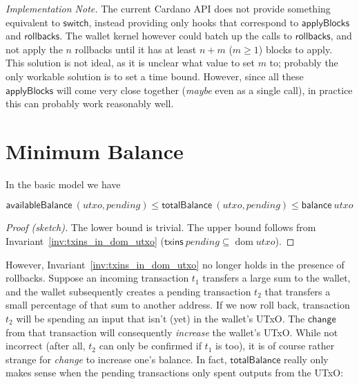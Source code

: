 \documentclass{article}
\DeclareMathOperator{\dom}{dom}
\theoremstyle{definition}{
  \newtheorem{lemma}{Lemma}[section] %
  \newtheorem{definition}[lemma]{Definition}
}
\theoremstyle{theorem}{
  \newtheorem{invariant}[lemma]{Invariant}
  \newtheorem{proofobligation}[lemma]{Proof Obligation}
}
\numberwithin{equation}{lemma}
\begin{document}
\emph{Implementation Note.} The current Cardano API does not provide something
equivalent to $\mathsf{switch}$, instead providing only hooks that correspond to
$\mathsf{applyBlocks}$ and $\mathsf{rollbacks}$. The wallet kernel however could
batch up the calls to $\mathsf{rollbacks}$, and not apply the $n$ rollbacks
until it has at least $n + m$ ($m \ge 1$) blocks to apply. This solution is not
ideal, as it is unclear what value to set $m$ to; probably the only workable
solution is to set a time bound. However, since all these $\mathsf{applyBlocks}$
will come very close together (\emph{maybe} even as a single call), in practice
this can probably work reasonably well.


\section{Minimum Balance}
\label{sec:tracking_expected_UTxO}

In the basic model we have
%
\begin{lemma}
\begin{equation*}
    \mathsf{availableBalance} ~ (\mathit{utxo}, \mathit{pending})
\le \mathsf{totalBalance}     ~ (\mathit{utxo}, \mathit{pending})
\le \mathsf{balance} ~ \mathit{utxo}
\end{equation*}
\label{lem:bounds_in_basic_model}
\end{lemma}

\begin{proof}[Proof (sketch)]
The lower bound is trivial. The upper bound follows from
Invariant~\ref{inv:txins_in_dom_utxo} ($\mathsf{txins} ~ \mathit{pending}
\subseteq \dom \mathit{utxo}$).
\end{proof}

However, Invariant~\ref{inv:txins_in_dom_utxo} no longer holds in the presence
of rollbacks. Suppose an incoming transaction $t_1$ transfers a large sum to the
wallet, and the wallet subsequently creates a pending transaction $t_2$ that
transfers a small percentage of that sum to another address. If we now roll
back, transaction $t_2$ will be spending an input that isn't (yet) in the
wallet's UTxO. The $\mathsf{change}$ from that transaction will consequently
\emph{increase} the wallet's UTxO. While not incorrect (after all, $t_2$ can
only be confirmed if $t_1$ is too), it is of course rather strange for
\emph{change} to increase one's balance. In fact, $\mathsf{totalBalance}$
really only makes sense when the pending transactions only spent outputs from
the UTxO:
\end{document}
